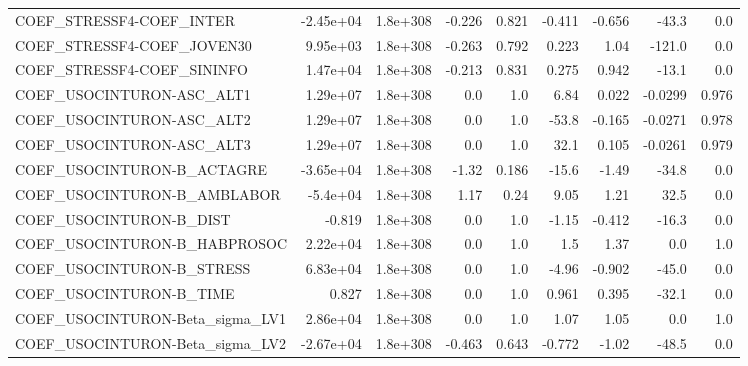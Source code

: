 \begin{tabular}{lrrrrrrrr}
COEF\_STRESSF4-COEF\_INTER          &   -2.45e+04 &     1.8e+308 &   -0.226 &    0.821 &     -0.411 &      -0.656 &        -43.3 &           0.0 \\
COEF\_STRESSF4-COEF\_JOVEN30        &    9.95e+03 &     1.8e+308 &   -0.263 &    0.792 &      0.223 &        1.04 &       -121.0 &           0.0 \\
COEF\_STRESSF4-COEF\_SININFO        &    1.47e+04 &     1.8e+308 &   -0.213 &    0.831 &      0.275 &       0.942 &        -13.1 &           0.0 \\
COEF\_USOCINTURON-ASC\_ALT1         &    1.29e+07 &     1.8e+308 &      0.0 &      1.0 &       6.84 &       0.022 &      -0.0299 &         0.976 \\
COEF\_USOCINTURON-ASC\_ALT2         &    1.29e+07 &     1.8e+308 &      0.0 &      1.0 &      -53.8 &      -0.165 &      -0.0271 &         0.978 \\
COEF\_USOCINTURON-ASC\_ALT3         &    1.29e+07 &     1.8e+308 &      0.0 &      1.0 &       32.1 &       0.105 &      -0.0261 &         0.979 \\
COEF\_USOCINTURON-B\_ACTAGRE        &   -3.65e+04 &     1.8e+308 &    -1.32 &    0.186 &      -15.6 &       -1.49 &        -34.8 &           0.0 \\
COEF\_USOCINTURON-B\_AMBLABOR       &    -5.4e+04 &     1.8e+308 &     1.17 &     0.24 &       9.05 &        1.21 &         32.5 &           0.0 \\
COEF\_USOCINTURON-B\_DIST           &      -0.819 &     1.8e+308 &      0.0 &      1.0 &      -1.15 &      -0.412 &        -16.3 &           0.0 \\
COEF\_USOCINTURON-B\_HABPROSOC      &    2.22e+04 &     1.8e+308 &      0.0 &      1.0 &        1.5 &        1.37 &          0.0 &           1.0 \\
COEF\_USOCINTURON-B\_STRESS         &    6.83e+04 &     1.8e+308 &      0.0 &      1.0 &      -4.96 &      -0.902 &        -45.0 &           0.0 \\
COEF\_USOCINTURON-B\_TIME           &       0.827 &     1.8e+308 &      0.0 &      1.0 &      0.961 &       0.395 &        -32.1 &           0.0 \\
COEF\_USOCINTURON-Beta\_sigma\_LV1   &    2.86e+04 &     1.8e+308 &      0.0 &      1.0 &       1.07 &        1.05 &          0.0 &           1.0 \\
COEF\_USOCINTURON-Beta\_sigma\_LV2   &   -2.67e+04 &     1.8e+308 &   -0.463 &    0.643 &     -0.772 &       -1.02 &        -48.5 &           0.0 \\

\end{tabular}
